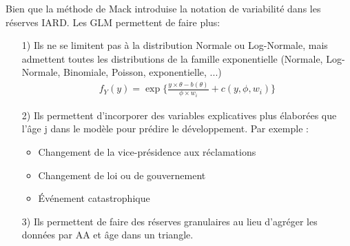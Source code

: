\documentclass[11pt,french]{report}
\begin{document}
Bien que la méthode de Mack introduise la notation de variabilité dans les réserves IARD. Les GLM permettent de faire plus:
\begin{itemize}
\item[1)] Ils ne se limitent pas à la distribution Normale ou Log-Normale, mais admettent toutes les distributions de la famille exponentielle (Normale, Log-Normale, Binomiale, Poisson, exponentielle, ...)
\begin{align*}
f_Y(y) = \exp \Big \lbrace \frac{y \times \theta - b(\theta)}{\phi \times w_i} + c(y, \phi, w_i) \Big\rbrace 
\end{align*}
\item[2)] Ils permettent d'incorporer des variables explicatives plus élaborées que l'âge j dans le modèle pour prédire le développement. Par exemple :
\begin{itemize}
\item Changement de la vice-présidence aux réclamations
\item Changement de loi ou de gouvernement
\item Événement catastrophique
\end{itemize}
\item[3)] Ils permettent de faire des réserves granulaires au lieu d'agréger les données par AA et âge dans un triangle.
\end{itemize}
\end{document}
